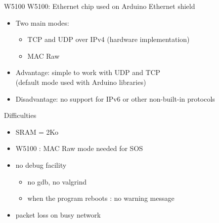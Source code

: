 \begin{frame} {W5100}
	W5100: Ethernet chip used on Arduino Ethernet shield
	\begin{itemize}
		\item Two main modes:
		\begin{itemize}
			\item TCP and UDP over IPv4 (hardware
			    implementation)
			\item MAC Raw
		\end{itemize}
		\item Advantage: simple to work with UDP and TCP \\
		    (default mode used with Arduino libraries)
		\item Disadvantage: no support for IPv6 or other
		    non-built-in protocols
	\end{itemize}
\end{frame}

\begin{frame} {Difficulties}
    \begin{itemize}
		\item SRAM = 2Ko
		\item W5100 : MAC Raw mode needed for SOS
		\item no debug facility
		\begin{itemize}
			\item no gdb, no valgrind
			\item when the program reboots : no warning message
		\end{itemize}
		\item packet loss on busy network
    \end{itemize}
\end{frame}


